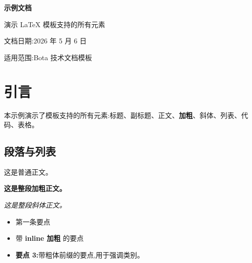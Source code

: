 \documentclass[11pt,a4paper]{ctexart}
\begin{document}
\begin{titlepage}
\centering
\vspace*{4cm}
{\color{HeadingBlue}\bfseries\fontsize{28}{34}\selectfont 示例文档}\par
\vspace{1cm}
{\color{Subtitle}\fontsize{18}{22}\selectfont 演示 LaTeX 模板支持的所有元素}\par
\vspace{2cm}
{\color{Meta}\fontsize{11}{14}\selectfont 文档日期:2026 年 5 月 6 日}\par
\vspace{0.3cm}
{\color{Meta}\fontsize{11}{14}\selectfont 适用范围:Bota 技术文档模板}\par
\vspace{0.3cm}
\end{titlepage}

{\setlength{\parskip}{0pt}\tableofcontents}

\clearpage

\clearpage

\section{引言}

本示例演示了模板支持的所有元素:标题、副标题、正文、\textbf{加粗}、斜体、列表、代码、表格。\par

\subsection{段落与列表}

这是普通正文。\par

\textbf{这是整段加粗正文。}\par

\textit{这是整段斜体正文。}\par

\begin{itemize}

\item 第一条要点

\item 带 \textbf{inline 加粗} 的要点

\item \textbf{要点 3:}带粗体前缀的要点,用于强调类别。

\end{itemize}

\clearpage
\end{document}
